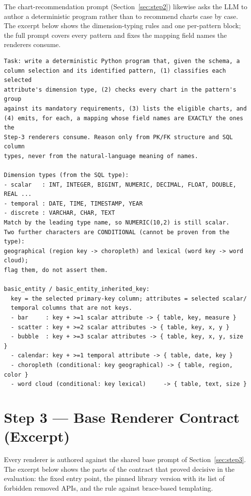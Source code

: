 The chart-recommendation prompt (Section~\ref{sec:step2}) likewise asks the LLM to author a
deterministic program rather than to recommend charts case by case. The excerpt below
shows the dimension-typing rules and one per-pattern block; the full prompt covers every
pattern and fixes the mapping field names the renderers consume.

\begin{verbatim}
Task: write a deterministic Python program that, given the schema, a
column selection and its identified pattern, (1) classifies each selected
attribute's dimension type, (2) checks every chart in the pattern's group
against its mandatory requirements, (3) lists the eligible charts, and
(4) emits, for each, a mapping whose field names are EXACTLY the ones the
Step-3 renderers consume. Reason only from PK/FK structure and SQL column
types, never from the natural-language meaning of names.

Dimension types (from the SQL type):
- scalar   : INT, INTEGER, BIGINT, NUMERIC, DECIMAL, FLOAT, DOUBLE, REAL ...
- temporal : DATE, TIME, TIMESTAMP, YEAR
- discrete : VARCHAR, CHAR, TEXT
Match by the leading type name, so NUMERIC(10,2) is still scalar.
Two further characters are CONDITIONAL (cannot be proven from the type):
geographical (region key -> choropleth) and lexical (word key -> word cloud);
flag them, do not assert them.

basic_entity / basic_entity_inherited_key:
  key = the selected primary-key column; attributes = selected scalar/
  temporal columns that are not keys.
  - bar     : key + >=1 scalar attribute -> { table, key, measure }
  - scatter : key + >=2 scalar attributes -> { table, key, x, y }
  - bubble  : key + >=3 scalar attributes -> { table, key, x, y, size }
  - calendar: key + >=1 temporal attribute -> { table, date, key }
  - choropleth (conditional: key geographical) -> { table, region, color }
  - word cloud (conditional: key lexical)     -> { table, text, size }
\end{verbatim}

\section{Step 3 --- Base Renderer Contract (Excerpt)}
\label{app:step3-prompt}

Every renderer is authored against the shared base prompt of
Section~\ref{sec:step3}. The excerpt below shows the parts of the contract that proved
decisive in the evaluation: the fixed entry point, the pinned library version with its
list of forbidden removed APIs, and the rule against brace-based templating.

